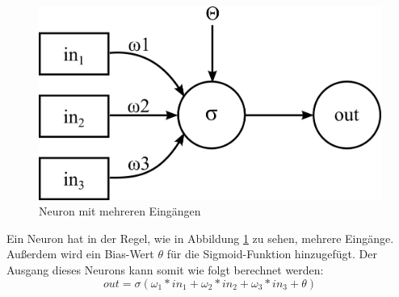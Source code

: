 \begin{figure}
	\centering
	\includegraphics[scale=1]{images/neuron-multiple-inputs.png}
	\caption{Neuron mit mehreren Eingängen}
	\label{fig:neuron-multiple-inputs}
\end{figure}

Ein Neuron hat in der Regel, wie in Abbildung \ref{fig:neuron-multiple-inputs} zu sehen, mehrere Eingänge. Außerdem wird ein Bias-Wert $\theta$ für die Sigmoid-Funktion hinzugefügt. Der Ausgang dieses Neurons kann somit wie folgt berechnet werden:
$$out = \sigma(\omega_1*in_1 + \omega_2*in_2 + \omega_3*in_3 + \theta)$$

